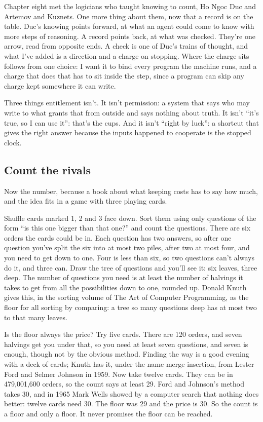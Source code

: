 \documentclass[11pt,twoside]{article}
\theoremstyle{thielethm}
\theoremstyle{thieledef}
\theoremstyle{thieledef}
\theoremstyle{thieledef}
\theoremstyle{thielethm}
\theoremstyle{thieleobs}
\theoremstyle{thielethm}
\begin{document}
Chapter eight met the logicians who taught knowing to count, Ho Ngoc Duc and Artemov and Kuznets. One more thing about them, now that a record is on the table. Duc's knowing points forward, at what an agent could come to know with more steps of reasoning. A record points back, at what was checked. They're one arrow, read from opposite ends. A check is one of Duc's trains of thought, and what I've added is a direction and a charge on stopping. Where the charge sits follows from one choice: I want it to bind every program the machine runs, and a charge that does that has to sit inside the step, since a program can skip any charge kept somewhere it can write.

Three things entitlement isn't. It isn't permission: a system that says who may write to what grants that from outside and says nothing about truth. It isn't ``it's true, so I can use it'': that's the cups. And it isn't ``right by luck'': a shortcut that gives the right answer because the inputs happened to cooperate is the stopped clock.

\subsection{Count the rivals}

Now the number, because a book about what keeping costs has to say how much, and the idea fits in a game with three playing cards.

Shuffle cards marked 1, 2 and 3 face down. Sort them using only questions of the form ``is this one bigger than that one?'' and count the questions. There are six orders the cards could be in. Each question has two answers, so after one question you've split the six into at most two piles, after two at most four, and you need to get down to one. Four is less than six, so two questions can't always do it, and three can. Draw the tree of questions and you'll see it: six leaves, three deep. The number of questions you need is at least the number of halvings it takes to get from all the possibilities down to one, rounded up. Donald Knuth gives this, in the sorting volume of The Art of Computer Programming, as the floor for all sorting by comparing: a tree so many questions deep has at most two to that many leaves.

Is the floor always the price? Try five cards. There are 120 orders, and seven halvings get you under that, so you need at least seven questions, and seven is enough, though not by the obvious method. Finding the way is a good evening with a deck of cards; Knuth has it, under the name merge insertion, from Lester Ford and Selmer Johnson in 1959. Now take twelve cards. They can be in 479,001,600 orders, so the count says at least 29. Ford and Johnson's method takes 30, and in 1965 Mark Wells showed by a computer search that nothing does better: twelve cards need 30. The floor was 29 and the price is 30. So the count is a floor and only a floor. It never promises the floor can be reached.
\end{document}
